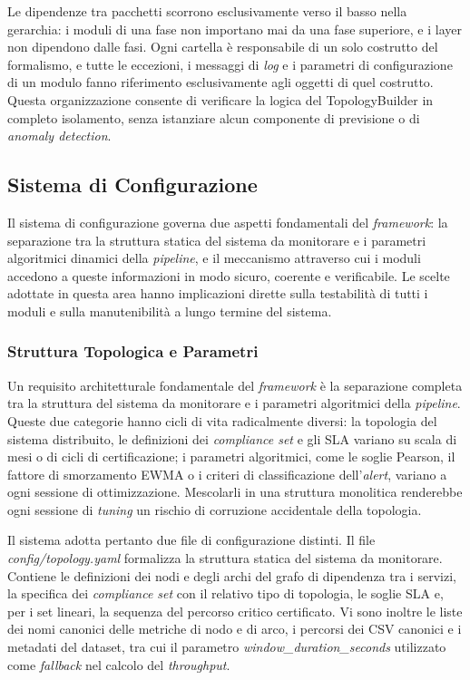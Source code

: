 Le dipendenze tra pacchetti scorrono esclusivamente verso il basso nella gerarchia: i moduli di
una fase non importano mai da una fase superiore, e i layer non dipendono dalle fasi. Ogni
cartella è responsabile di un solo costrutto del formalismo, e tutte le eccezioni, i messaggi di
\textit{log} e i parametri di configurazione di un modulo fanno riferimento esclusivamente agli
oggetti di quel costrutto. Questa organizzazione consente di verificare la logica del
TopologyBuilder in completo isolamento, senza istanziare alcun componente di previsione o di
\textit{anomaly detection}.

\subsection{Sistema di Configurazione}
\label{sec:config_system}

Il sistema di configurazione governa due aspetti fondamentali del \textit{framework}: la
separazione tra la struttura statica del sistema da monitorare e i parametri algoritmici dinamici
della \textit{pipeline}, e il meccanismo attraverso cui i moduli accedono a queste informazioni
in modo sicuro, coerente e verificabile. Le scelte adottate in questa area hanno implicazioni
dirette sulla testabilità di tutti i moduli e sulla manutenibilità a lungo termine del sistema.

\subsubsection{Struttura Topologica e Parametri}
\label{subsec:sep_yaml}

Un requisito architetturale fondamentale del \textit{framework} è la separazione completa tra
la struttura del sistema da monitorare e i parametri algoritmici della \textit{pipeline}. Queste
due categorie hanno cicli di vita radicalmente diversi: la topologia del sistema distribuito, le
definizioni dei \textit{compliance set} e gli \gls{SLA} variano su scala di mesi o di cicli di
certificazione; i parametri algoritmici, come le soglie Pearson, il fattore di smorzamento
\gls{EWMA} o i criteri di classificazione dell'\textit{alert}, variano a ogni sessione di
ottimizzazione. Mescolarli in una struttura monolitica renderebbe ogni sessione di \textit{tuning}
un rischio di corruzione accidentale della topologia.

Il sistema adotta pertanto due file di configurazione distinti. Il file \textit{config/topology.yaml}
formalizza la struttura statica del sistema da monitorare. Contiene le definizioni dei nodi e
degli archi del grafo di dipendenza tra i servizi, la specifica dei \textit{compliance set} con
il relativo tipo di topologia, le soglie \gls{SLA} e, per i set lineari, la sequenza del
percorso critico certificato. Vi sono inoltre le liste dei nomi canonici delle metriche di nodo e
di arco, i percorsi dei CSV canonici e i metadati del dataset, tra cui il parametro
\textit{window\_duration\_seconds} utilizzato come \textit{fallback} nel calcolo del
\textit{throughput}.


